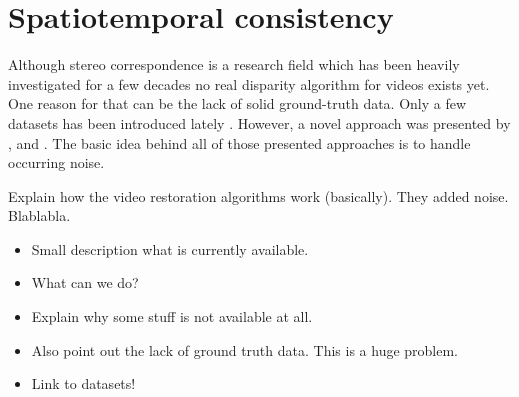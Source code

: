 \section{Spatiotemporal consistency}

Although stereo correspondence is a research field which has been heavily investigated for a few decades no real disparity algorithm for videos exists yet.
One reason for that can be the lack of solid ground-truth data.
Only a few datasets has been introduced lately \citep{Butler:ECCV:2012, scharstein2014high}.
However, a novel approach was presented by \citep{richardt2010real}, \citep{khoshabeh2011spatio} and \citep{hosni2012temporally}.
The basic idea behind all of those presented approaches is to handle occurring noise.

\newpage

Explain how the video restoration algorithms work (basically). They added noise. Blablabla.

\newpage

\begin{itemize}
  \item Small description what is currently available.
  \item What can we do?
  \item Explain why some stuff is not available at all.
  \item Also point out the lack of ground truth data. This is a huge problem.
  \item Link to datasets!
\end{itemize}


